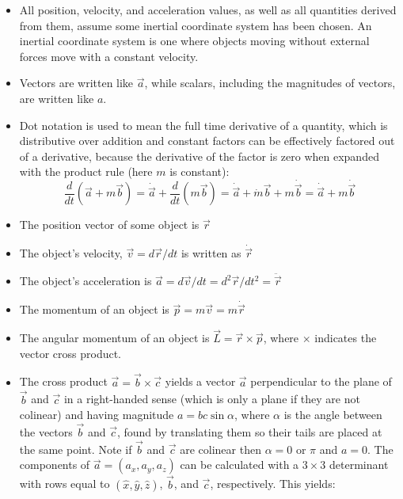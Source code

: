 \documentclass[10pt]{article}
\begin{document}
\begin{itemize}
    \item All position, velocity, and acceleration values, as well as 
    all quantities derived from them, assume some inertial
    coordinate system has been chosen. An inertial coordinate system is one 
    where objects moving without external forces move with a constant velocity.
    \item Vectors are written like $\vec{a}$, while scalars, including the 
    magnitudes of  vectors, are written like $a$.
    \item Dot notation is used to mean the full time derivative of a quantity, 
    which is distributive over addition and constant factors can be 
    effectively factored out of a derivative, because the derivative of the 
    factor is zero when expanded with the product rule (here $m$ is constant):
    \begin{equation*}
        \frac{d}{dt}(\vec{a}+m\vec{b}) = \dot{\vec{a}}+\frac{d}{dt}(m\vec{b}) 
        = \dot{\vec{a}}+\dot{m}\vec{b} + m\dot{\vec{b}} 
        = \dot{\vec{a}}+m\dot{\vec{b}}
    \end{equation*}
    \item The position vector of some object is $\vec{r}$
    \item The object's velocity, $\vec{v} = d\vec{r}/dt$ is written as 
    $\dot{\vec{r}}$
    \item The object's acceleration is 
    $\vec{a} = d\vec{v}/dt=d^2\vec{r}/dt^2=\ddot{\vec{r}}$
    \item The momentum of an object is $\vec{p}=m\vec{v}=m\dot{\vec{r}}$
    \item The angular momentum of an object is $\vec{L}=\vec{r}\times\vec{p}$,
    where $\times$ indicates the vector cross product. 
    \item The cross product $\vec{a}=\vec{b}\times\vec{c}$ yields a vector 
    $\vec{a}$ perpendicular to the plane of $\vec{b}$ and $\vec{c}$ 
    in a right-handed sense (which is only a plane if they are not colinear) 
    and having magnitude $a=bc\sin\alpha$, where $\alpha$ is the angle 
    between the vectors $\vec{b}$ and $\vec{c}$, found by translating them so 
    their tails are placed at the same point. Note if $\vec{b}$ and $\vec{c}$
    are colinear then $\alpha=0$ or $\pi$ and $a=0$. The components of 
    $\vec{a} = (a_x,a_y,a_z)$ can be calculated with a $3\times3$ determinant
    with rows equal to $(\hat{x},\hat{y},\hat{z})$, $\vec{b}$, and $\vec{c}$, 
    respectively. This yields:

\end{itemize}
\end{document}
